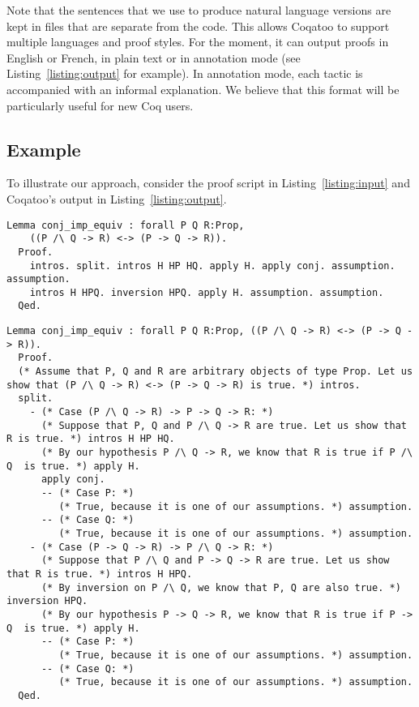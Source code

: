 \documentclass[sigplan,9pt]{acmart}\settopmatter{printfolios=true,printccs=false,printacmref=false}
\begin{document}
Note that the sentences that we use to produce natural language versions are kept in files that are separate from the code. This allows Coqatoo to support multiple languages and proof styles. For the moment, it can output proofs in English or French, in plain text or in annotation mode (see Listing~\ref{listing:output} for example). In annotation mode, each tactic is accompanied with an informal explanation. We believe that this format will be particularly useful for new Coq users.

\subsection{Example}
To illustrate our approach, consider the proof script in Listing~\ref{listing:input} and Coqatoo's output in Listing~\ref{listing:output}.
\begin{lstlisting}[label=listing:input,captionpos=b,caption=Proof script given as input]
  Lemma conj_imp_equiv : forall P Q R:Prop, 
    ((P /\ Q -> R) <-> (P -> Q -> R)).
  Proof.
    intros. split. intros H HP HQ. apply H. apply conj. assumption. assumption. 
    intros H HPQ. inversion HPQ. apply H. assumption. assumption.
  Qed.
\end{lstlisting}

\begin{figure*}
\begin{lstlisting}[label=listing:output, captionpos=b, caption={Output in annotation mode}]
  Lemma conj_imp_equiv : forall P Q R:Prop, ((P /\ Q -> R) <-> (P -> Q -> R)).
  Proof.
  (* Assume that P, Q and R are arbitrary objects of type Prop. Let us show that (P /\ Q -> R) <-> (P -> Q -> R) is true. *) intros.
  split.
    - (* Case (P /\ Q -> R) -> P -> Q -> R: *) 
      (* Suppose that P, Q and P /\ Q -> R are true. Let us show that R is true. *) intros H HP HQ.
      (* By our hypothesis P /\ Q -> R, we know that R is true if P /\ Q  is true. *) apply H.
      apply conj.
      -- (* Case P: *)
         (* True, because it is one of our assumptions. *) assumption.
      -- (* Case Q: *)
         (* True, because it is one of our assumptions. *) assumption.
    - (* Case (P -> Q -> R) -> P /\ Q -> R: *)
      (* Suppose that P /\ Q and P -> Q -> R are true. Let us show that R is true. *) intros H HPQ.
      (* By inversion on P /\ Q, we know that P, Q are also true. *) inversion HPQ.
      (* By our hypothesis P -> Q -> R, we know that R is true if P -> Q  is true. *) apply H.
      -- (* Case P: *)
         (* True, because it is one of our assumptions. *) assumption.
      -- (* Case Q: *)
         (* True, because it is one of our assumptions. *) assumption.
  Qed.
\end{lstlisting}
\end{figure*}
\end{document}
